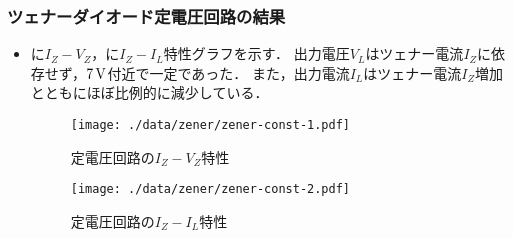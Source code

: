 \subsubsection{ツェナーダイオード定電圧回路の結果}
\begin{itemize}
	\item {}に$I_{Z}-V_{Z}$，に$I_{Z}-I_{L}$特性グラフを示す．
出力電圧$V_L$はツェナー電流$I_Z$に依存せず，$7\,\rm{V}$付近で一定であった．
また，出力電流$I_{L}$はツェナー電流$I_Z$増加とともにほぼ比例的に減少している．
\begin{figure}[h]
	\centering
	\texttt{[image: ./data/zener/zener-const-1.pdf]}
	\caption{定電圧回路の$I_Z-V_Z$特性}
	\label{fig:zener-const-1}
\end{figure}
\begin{figure}[h]
	\centering
	\texttt{[image: ./data/zener/zener-const-2.pdf]}
	\caption{定電圧回路の$I_Z-I_L$特性}
	\label{fig:zener-const-2}
\end{figure}
\end{itemize}

\clearpage

